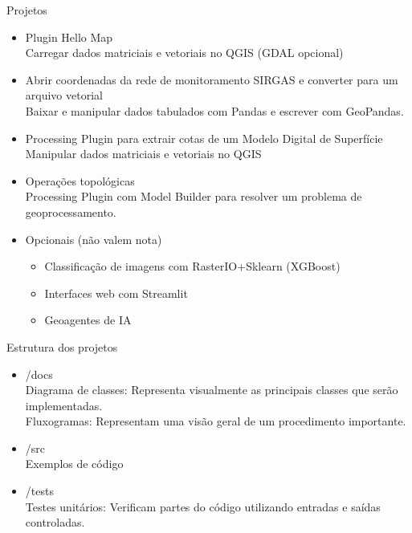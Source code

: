 \documentclass{beamer}
\begin{document}
\begin{frame}{Projetos}
    \begin{itemize}
        \item Plugin Hello Map
        \\ Carregar dados matriciais e vetoriais no QGIS (GDAL opcional)
        \item Abrir coordenadas da rede de monitoramento SIRGAS e converter para um arquivo vetorial
        \\ Baixar e manipular dados tabulados com Pandas e escrever com GeoPandas.
        \item Processing Plugin para extrair cotas de um Modelo Digital de Superfície
        \\ Manipular dados matriciais e vetoriais no QGIS
        \item Operações topológicas
        \\ Processing Plugin com Model Builder para resolver um problema de geoprocessamento.
        \item Opcionais (não valem nota)
        \begin{itemize}
            \item Classificação de imagens com RasterIO+Sklearn (XGBoost)
            \item Interfaces web com Streamlit          
            \item Geoagentes de IA
        \end{itemize}
        
    \end{itemize}
\end{frame}

\begin{frame}{Estrutura dos projetos}
    \begin{itemize}
        \item /docs
        \\ Diagrama de classes: Representa visualmente as principais classes que serão implementadas.
        \\ Fluxogramas: Representam uma visão geral de um procedimento importante.
        \item /src
        \\ Exemplos de código
        \item /tests 
        \\ Testes unitários: Verificam partes do código utilizando entradas e saídas controladas.
    \end{itemize}   
\end{frame}
\end{document}
